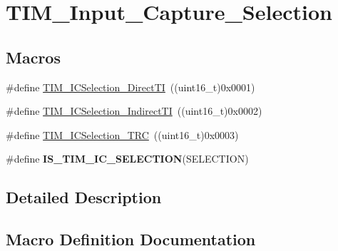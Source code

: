 \hypertarget{group___t_i_m___input___capture___selection}{}\section{T\+I\+M\+\_\+\+Input\+\_\+\+Capture\+\_\+\+Selection}
\label{group___t_i_m___input___capture___selection}
\subsection*{Macros}
\begin{DoxyCompactItemize}
\item 
\#define \hyperlink{group___t_i_m___input___capture___selection_ga3d38876044457b7faefe951d367ac8c3}{T\+I\+M\+\_\+\+I\+C\+Selection\+\_\+\+Direct\+TI}~((uint16\+\_\+t)0x0001)
\item 
\#define \hyperlink{group___t_i_m___input___capture___selection_ga2289b684133ac0b81ddfcd860d01b144}{T\+I\+M\+\_\+\+I\+C\+Selection\+\_\+\+Indirect\+TI}~((uint16\+\_\+t)0x0002)
\item 
\#define \hyperlink{group___t_i_m___input___capture___selection_ga2cd464e97ffd6ea3208ec65672f9a373}{T\+I\+M\+\_\+\+I\+C\+Selection\+\_\+\+T\+RC}~((uint16\+\_\+t)0x0003)
\item 
\#define {\bfseries I\+S\+\_\+\+T\+I\+M\+\_\+\+I\+C\+\_\+\+S\+E\+L\+E\+C\+T\+I\+ON}(S\+E\+L\+E\+C\+T\+I\+ON)
\end{DoxyCompactItemize}


\subsection{Detailed Description}


\subsection{Macro Definition Documentation}
